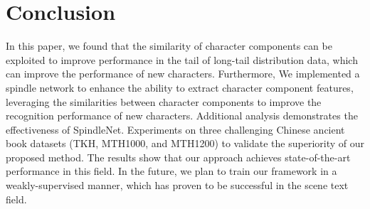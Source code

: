 
\section{Conclusion}
In this paper, we found that the similarity of character components can be exploited to improve performance in the tail of long-tail distribution data, which can improve the performance of new characters. 
Furthermore, We implemented a spindle network to enhance the ability to extract character component features, leveraging the similarities between character components to improve the recognition performance of new characters. Additional analysis demonstrates the effectiveness of SpindleNet.
Experiments on three challenging Chinese ancient book datasets (TKH, MTH1000, and MTH1200) to validate the superiority of our proposed method. The results show that our approach achieves state-of-the-art performance in this field.
In the future, we plan to train our framework in a weakly-supervised manner, which has proven to be successful in the scene text field.

